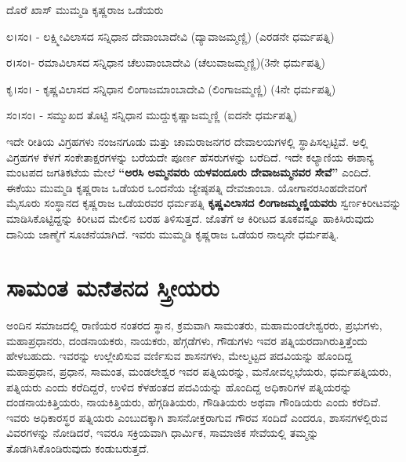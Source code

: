 ದೊರೆ  ಖಾಸ್​  ಮುಮ್ಮಡಿ ಕೃಷ್ಣರಾಜ ಒಡೆಯರು

ಲ।ಸಂ। - ಲಕ್ಷ್ಮೀವಿಲಾಸದ ಸನ್ನಿಧಾನ ದೇವಾಂಬಾದೇವಿ (ದ್ಯಾವಾಜಮ್ಮಣ್ಣಿ) (ಎರಡನೇ ಧರ್ಮಪತ್ನಿ)

ರ।ಸಂ।- ರಮಾವಿಲಾಸದ ಸನ್ನಿಧಾನ ಚೆಲುವಾಂಬಾದೇವಿ (ಚೆಲುವಾಜಮ್ಮಣ್ಣಿ)(3ನೇ ಧರ್ಮಪತ್ನಿ)

ಕೃ।ಸಂ। - ಕೃಷ್ಣವಿಲಾಸದ ಸನ್ನಿಧಾನ ಲಿಂಗಾಜಮಾಂಬಾದೇವಿ (ಲಿಂಗಾಜಮ್ಮಣ್ಣಿ) (4ನೇ ಧರ್ಮಪತ್ನಿ)

ಸಂ।ಸಂ। - ಸಮ್ಮುಖದ ತೊಟ್ಟಿ ಸನ್ನಿಧಾನ ಮುದ್ದುಕೃಷ್ಣಾಜಮ್ಮಣ್ಣಿ (ಐದನೇ ಧರ್ಮಪತ್ನಿ)

ಇದೇ ರೀತಿಯ ವಿಗ್ರಹಗಳು ನಂಜನಗೂಡು ಮತ್ತು ಚಾಮರಾಜನಗರ ದೇವಾಲಯಗಳಲ್ಲಿ ಸ್ಥಾಪಿಸಲ್ಪಟ್ಟಿವೆ. ಅಲ್ಲಿ ವಿಗ್ರಹಗಳ ಕೆಳಗೆ ಸಂಕೇತಾಕ್ಷರಗಳನ್ನು ಬರೆಯದೇ ಪೂರ್ಣ ಹೆಸರುಗಳನ್ನು ಬರೆದಿದೆ. ಇದೇ ಕಲ್ಯಾಣಿಯ ಈಶಾನ್ಯ ಮಂಟಪದ ಜಗತಿಕಟೆಯ ಮೇಲೆ \textbf{“ಅರಸಿ ಅಮ್ಮನವರು ಯಳವಂದೂರು ದೇವಾಜಮ್ಮನವರ ಸೇವೆ”} ಎಂದಿದೆ. ಈಕೆಯು ಮುಮ್ಮಡಿ ಕೃಷ್ಣರಾಜ ಒಡೆಯರ ಒಂದನೆಯ ಜ್ಯೇಷ್ಠಪತ್ನಿ ದೇವಜಾಂಬಾ. ಯೋಗಾನರಸಿಂಹದೇವರಿಗೆ ಮೈಸೂರು ಸಂಸ್ಥಾನದ ಕೃಷ್ಣರಾಜ ಒಡೆಯರವರ ಧರ್ಮಪತ್ನಿ \textbf{ಕೃಷ್ಣವಿಲಾಸದ ಲಿಂಗಾಜಮ್ಮಣ್ಣಿಯವರು} ಸ್ವರ್ಣಕಿರೀಟವನ್ನು ಮಾಡಿಸಿಕೊಟ್ಟಿದ್ದನ್ನು ಕಿರೀಟದ ಮೇಲಿನ ಬರಹ ತಿಳಿಸುತ್ತದೆ. ಜೊತೆಗೆ ಆ ಕಿರೀಟದ ತೂಕವನ್ನೂ ಹಾಕಿಸಿರುವುದು ದಾನಿಯ ಜಾಣ್ಮೆಗೆ ಸೂಚನೆಯಾಗಿದೆ. ಇವರು ಮುಮ್ಮಡಿ ಕೃಷ್ಣರಾಜ ಒಡೆಯರ ನಾಲ್ಕನೇ ಧರ್ಮಪತ್ನಿ.


\section*{ಸಾಮಂತ ಮನೆತನದ ಸ್ತ್ರೀಯರು}

ಅಂದಿನ ಸಮಾಜದಲ್ಲಿ ರಾಣಿಯರ ನಂತರದ ಸ್ಥಾನ, ಕ್ರಮವಾಗಿ ಸಾಮಂತರು, ಮಹಾಮಂಡಲೇಶ್ವರರು, ಪ್ರಭುಗಳು, ಮಹಾಪ್ರಧಾನರು, ದಂಡನಾಯಕರು, ನಾಯಕರು, ಹೆಗ್ಗಡೆಗಳು, ಗೌಡುಗಳು ಇವರ ಪತ್ನಿಯರದಾಗಿರುತ್ತಿತ್ತೆಂದು ಹೇಳಬಹುದು. ಇವರನ್ನು ಉಲ್ಲೇಖಿಸುವ ವರ್ಣಿಸುವ ಶಾಸನಗಳು, ಮೇಲ್ಮಟ್ಟದ ಪದವಿಯನ್ನು ಹೊಂದಿದ್ದ ಮಹಾಪ್ರಧಾನ, ಪ್ರಧಾನ, ಸಾಮಂತ, ಮಂಡಲೇಶ್ವರ ಇವರ ಪತ್ನಿಯರನ್ನು, ಮನೋವಲ್ಲಭೆಯರು, ಧರ್ಮಪತ್ನಿಯರು, ಪತ್ನಿಯರು ಎಂದು ಕರೆದಿದ್ದರೆ, ಉಳಿದ ಕೆಳಹಂತದ ಪದವಿಯನ್ನು ಹೊಂದಿದ್ದ ಅಧಿಕಾರಿಗಳ ಪತ್ನಿಯರನ್ನು ದಂಡನಾಯಕಿತ್ತಿಯರು, ನಾಯಕಿತ್ತಿಯರು, ಹೆಗ್ಗಡಿತಿಯರು, ಗೌಡಿತಿಯರು ಅಥವಾ ಗೌಂಡಿಯರು ಎಂದು ಕರೆದಿವೆ. ಇವರು ಅಧಿಕಾರಸ್ಥರ ಪತ್ನಿಯರು ಎಂಬುದಕ್ಕಾಗಿ ಶಾಸನೋಕ್ತರಾಗುವ ಗೌರವ ಸಂದಿದೆ ಎಂದರೂ, ಶಾಸನಗಳಲ್ಲಿರುವ ವಿವರಗಳನ್ನು ನೋಡಿದರೆ, ಇವರೂ ಸಕ್ರಿಯವಾಗಿ ಧಾರ್ಮಿಕ, ಸಾಮಾಜಿಕ ಸೇವೆಯಲ್ಲಿ ತಮ್ಮನ್ನು ತೊಡಗಿಸಿಕೊಂಡಿರುವುದು ಕಂಡುಬರುತ್ತದೆ.

